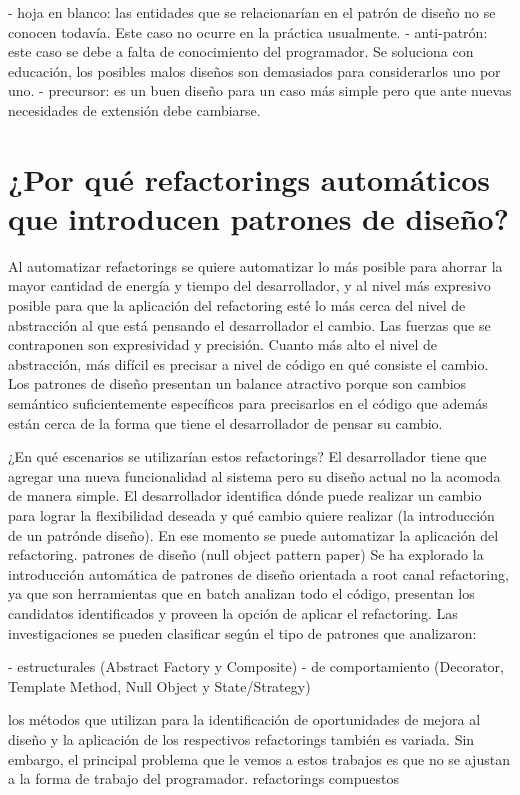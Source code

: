 - hoja en blanco: las entidades que se relacionarían en el patrón de diseño no se conocen todavía.
Este caso no ocurre en la práctica usualmente. - anti-patrón: este caso se debe a falta de
conocimiento del programador. Se soluciona con educación, los posibles malos diseños son demasiados
para considerarlos uno por uno. - precursor: es un buen diseño para un caso más simple pero que ante
nuevas necesidades de extensión debe cambiarse.

\section{¿Por qué refactorings automáticos que introducen patrones de diseño?}
Al automatizar refactorings se
quiere automatizar lo más posible para ahorrar la mayor cantidad de energía y tiempo del
desarrollador, y al nivel más expresivo posible para que la aplicación del refactoring esté lo más
cerca del nivel de abstracción al que está pensando el desarrollador el cambio. Las fuerzas que se
contraponen son expresividad y precisión. Cuanto más alto el nivel de abstracción, más difícil es
precisar a nivel de código en qué consiste el cambio. Los patrones de diseño presentan un balance
atractivo porque son cambios semántico suficientemente específicos para precisarlos en el código que
además están cerca de la forma que tiene el desarrollador de pensar su cambio.

¿En qué escenarios se utilizarían estos refactorings? El desarrollador tiene que agregar una nueva
funcionalidad al sistema pero su diseño actual no la acomoda de manera simple. El desarrollador
identifica dónde puede realizar un cambio para lograr la flexibilidad deseada y qué cambio quiere
realizar (la introducción de un patrónde diseño). En ese momento se puede automatizar la aplicación
del refactoring. patrones de diseño (null object pattern paper) Se ha explorado la introducción
automática de patrones de diseño orientada a root canal refactoring, ya que son herramientas que en
batch analizan todo el código, presentan los candidatos identificados y proveen la opción de aplicar
el refactoring. Las investigaciones se pueden clasificar según el tipo de patrones que analizaron:

- estructurales (Abstract Factory y Composite) - de comportamiento (Decorator, Template Method, Null
Object y State/Strategy)

los métodos que utilizan para la identificación de oportunidades de mejora al diseño y la aplicación
de los respectivos refactorings también es variada. Sin embargo, el principal problema que
le vemos a estos trabajos es que no se ajustan a la forma de trabajo del programador.
refactorings compuestos

